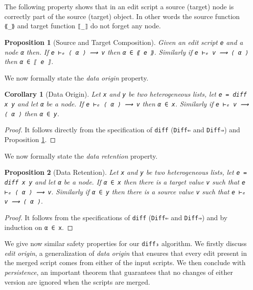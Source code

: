 \documentclass[preprint]{sigplanconf}
\theoremstyle{plain}
\newtheorem{prop}{Proposition}
\newtheorem{cor}{Corollary}
\begin{document}
The following property shows that in an edit script a source (target)
node is correctly part of the source (target) object.
%
In other words the source function \texttt{⟪\_⟫} and target function
\texttt{⟦\_⟧} do not forget any node.
\begin{prop}[Source and Target Composition]
\label{prop:source-target-cmp}
Given an edit script \texttt{e} and a node \texttt{α} then.
If \texttt{e ⊢ₑ ⟨ α ⟩ ⟿ v} then \texttt{α ∈ ⟪ e ⟫}.
Similarly if \texttt{e ⊢ₑ v ⟿ ⟨ α ⟩} then \texttt{α ∈ ⟦ e ⟧}.
\end{prop}

We now formally state the \emph{data origin} property.
\begin{cor}[Data Origin]
Let \texttt{x} and \texttt{y} be two heterogeneous lists, let \texttt{e = diff x y}
and let \texttt{α} be a node.
If \texttt{e ⊢ₑ ⟨ α ⟩ ⟿ v} then \texttt{α ∈ x}. Similarly if \texttt{e ⊢ₑ v ⟿ ⟨ α ⟩}
then \texttt{α ∈ y}.
\end{cor}    
\begin{proof}
  It follows directly from the specification of \texttt{diff}
  (\texttt{Diff⇐} and \texttt{Diff⇒}) and Proposition \ref{prop:source-target-cmp}.
\end{proof}

We now formally state the \emph{data retention} property.
\begin{prop}[Data Retention]
\label{prop:data-retention}
  Let \texttt{x} and \texttt{y} be two heterogeneous lists, let
  \texttt{e = diff x y} and let \texttt{α} be a node.
%
  If \texttt{α ∈ x} then there is a target value \texttt{v} such that
  \texttt{e ⊢ₑ ⟨ α ⟩ ⟿ v}.
%
  Similarly if \texttt{α ∈ y} then there is a source value \texttt{v} such that
  \texttt{e ⊢ₑ v ⟿ ⟨ α ⟩}.
\end{prop}
\begin{proof}
  It follows from the specifications of \texttt{diff} (\texttt{Diff⇐}
  and \texttt{Diff⇒}) and by induction on \texttt{α ∈ x}.
\end{proof}
 
  We give now similar safety properties for our \texttt{diff₃} algorithm.
  We firstly discuss \emph{edit origin}, a generalization of \emph{data origin}
  that ensures that every edit present in the merged script comes from either 
  of the input scripts. We then conclude with  \emph{persistence}, an important 
  theorem that guarantees that no changes of either version are ignored when
  the scripts are merged.
\end{document}
